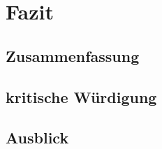 
\chapter{Fazit}
\todo{}

\section{Zusammenfassung}

\section{kritische Würdigung}

\section{Ausblick}